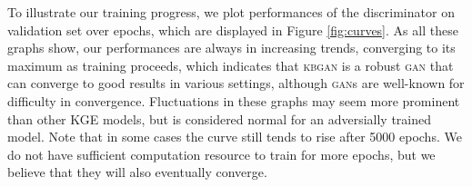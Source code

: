 \documentclass[11pt,a4paper]{article}
\begin{document}
To illustrate our training progress, we plot performances of the discriminator on validation set over epochs, which are displayed in Figure \ref{fig:curves}. As all these graphs show, our performances are always in increasing trends, converging to its maximum as training proceeds, which indicates that \textsc{kbgan} is a robust \textsc{gan} that can converge to good results in various settings, although \textsc{gan}s are well-known for difficulty in convergence. Fluctuations in these graphs may seem more prominent than other KGE models, but is considered normal for an adversially trained model. Note that in some cases the curve still tends to rise after 5000 epochs. We do not have sufficient computation resource to train for more epochs, but we believe that they will also eventually converge.
\end{document}
